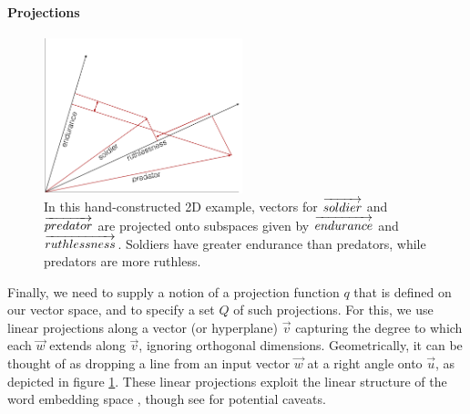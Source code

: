 \documentclass[9pt,twocolumn,twoside,lineno]{pnas-new}
\newcommand{\Listener}{L}
\newcommand{\QLONE}{\Listener_{{1}}^{{Q}}}
\begin{document}
	\paragraph{Projections} 

		\begin{figure}
		\centering
			\includegraphics[height=4.5cm]{images/diagram2.png}
			\caption{In this hand-constructed 2D example, vectors for $\protect\overrightarrow{soldier}$ and $\protect\overrightarrow{predator}$ are projected onto subspaces given by $\protect\overrightarrow{endurance}$ and $\protect\overrightarrow{ruthlessness}$. Soldiers have greater endurance than predators, while predators are more ruthless.}
			\label{fig:1}
		\end{figure}

		Finally, we need to supply a notion of a projection function $q$ that is defined on our vector space, and to specify a set $Q$ of such projections. 
		For this, we use linear projections
		along a vector (or hyperplane) $\overrightarrow{v}$ 
		capturing the degree to which each $\overrightarrow{w}$ extends along $\overrightarrow{v}$, ignoring orthogonal dimensions. Geometrically, it can be thought of as dropping a line from an input vector $\overrightarrow{w}$ at a right angle onto $\overrightarrow{u}$, as depicted in figure \ref{fig:1}. These linear projections exploit the linear structure of the word embedding space \cite{pennington2014glove}, though see \cite{linzen2016issues,finley2017analogies} for potential caveats.
\end{document}
